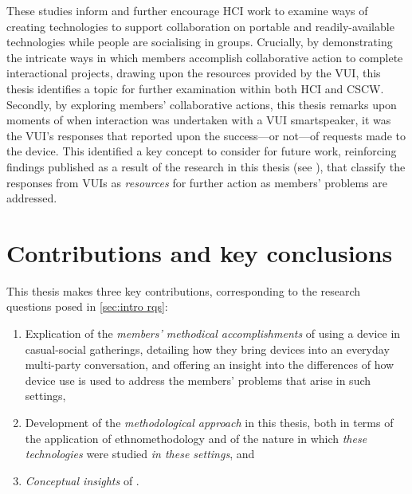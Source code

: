 \begin{revisedsubmission}
These studies inform and further encourage \ac{HCI} work to examine ways of creating technologies to support collaboration on portable and readily-available technologies while people are socialising in groups.
Crucially, by demonstrating the intricate ways in which members accomplish collaborative action to complete interactional projects, drawing upon the resources provided by the \ac{VUI}, this thesis identifies a topic for further examination within both \ac{HCI} and \ac{CSCW}.
Secondly, by exploring members' collaborative actions, this thesis remarks upon moments of when interaction was undertaken with a \ac{VUI} smartspeaker, it was the \ac{VUI}'s responses that reported upon the success---or not---of requests made to the device.
This identified a key concept to consider for future work, reinforcing findings published as a result of the research in this thesis (see \citet{Porcheron2018}), that classify the responses from \acp{VUI} as \textit{resources} for further action as members' problems are addressed.
\end{revisedsubmission}






\section{Contributions and key conclusions}\label{sec:synopsis conclusions contribs}
This thesis makes three key contributions, corresponding to the research questions posed in \ref{sec:intro rqs}:

\begin{revisedsubmission}
\begin{enumerate}
    \item Explication of the \textit{members' methodical accomplishments} of using a device in casual-social gatherings, detailing how they bring devices into an everyday multi-party conversation, and offering an insight into the differences of how device use is used to address the members' problems that arise in such settings,

    \item Development of the \textit{methodological approach} in this thesis, both in terms of the application of ethnomethodology and of the nature in which \textit{these technologies} were studied \textit{in these settings}, and

    \item \textit{Conceptual insights} of .
\end{enumerate}
\end{revisedsubmission}

